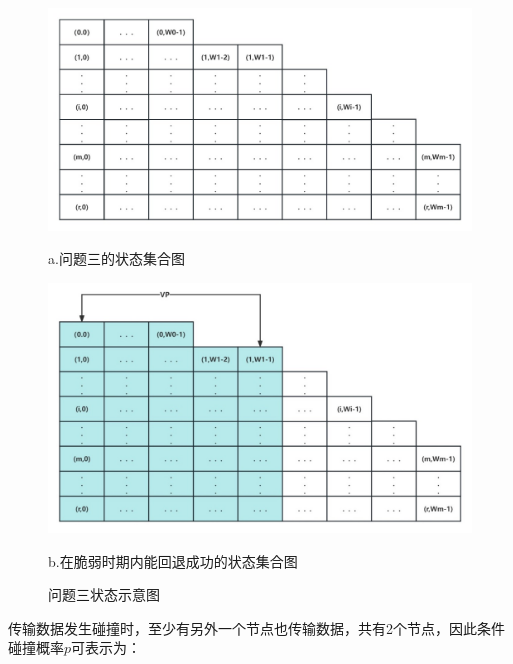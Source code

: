 \documentclass[bwprint]{gmcmthesis}
\begin{document}
\begin{figure}[H]
	\centering
            \begin{minipage}{0.7\linewidth}
                \vspace{3pt}
                \centerline{\includegraphics[width=\textwidth]{figures/tau31.png}}
                \centerline{a.问题三的状态集合图}
            \end{minipage}
            
            \qquad
            \begin{minipage}{0.7\linewidth}
                \vspace{3pt}
           \centerline{\includegraphics[width=\textwidth]{figures/tau3.png}}
                \centerline{b.在脆弱时期内能回退成功的状态集合图}
            \end{minipage}
            \caption{问题三状态示意图}
            \label{fig:tau3}
        \end{figure}

传输数据发生碰撞时，至少有另外一个节点也传输数据，共有2个节点，因此条件碰撞概率$p$可表示为：
\end{document}
